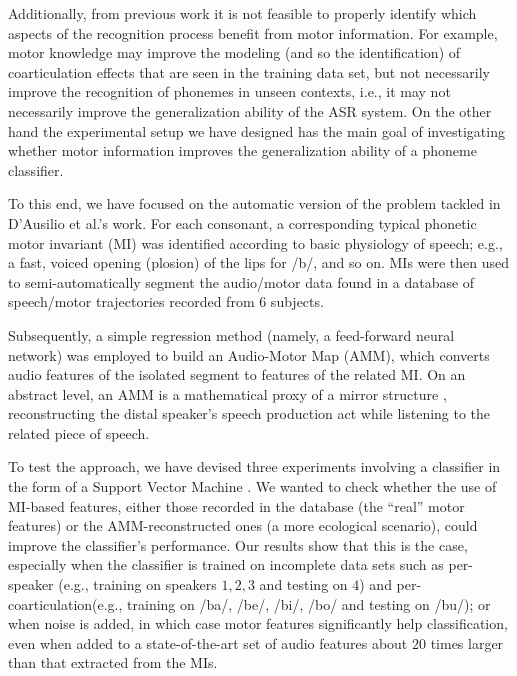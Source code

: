 Additionally, from previous work it is not feasible to properly identify which aspects of the recognition process benefit from motor information. For example, motor knowledge may improve the modeling (and so the identification) of coarticulation effects that are seen in the training data set, but not necessarily improve the recognition of phonemes in unseen contexts, i.e., it may not necessarily improve the generalization ability of the ASR system. On the other hand the experimental setup we have designed has the main goal of investigating whether motor information improves the generalization ability of a phoneme classifier.  


To this end, we have focused on the automatic version of
the problem tackled in D'Ausilio et al.'s work. For each consonant,
a corresponding typical phonetic motor invariant (MI) was
identified according to basic physiology of speech;
e.g., a fast, voiced opening (plosion) of the lips for /b/, and so on.
MIs were then used to semi-automatically segment the audio/motor data found in a
database of speech/motor trajectories recorded from $6$ subjects.

Subsequently, a simple regression method (namely, a feed-forward neural network) was employed
to build an Audio-Motor Map (AMM), which converts audio features of the isolated segment to
features of the related MI. On an abstract level, an AMM is a mathematical proxy of a mirror
structure \cite{umilta-01}, reconstructing the distal speaker's speech production act while
listening to the related piece of speech.

To test the approach, we have devised three experiments involving a 
classifier in the form of a Support Vector Machine \cite{BGV92}. We wanted to check whether
the use of MI-based features, either those recorded in the database (the ``real''
motor features) or the AMM-reconstructed ones (a more ecological scenario),
could improve the classifier's performance. Our results show that this is the case,
especially when the classifier is trained on incomplete data sets such as 
per-speaker (e.g., training on speakers $1,2,3$ and testing on $4$) and
per-coarticulation(e.g., training on /ba/, /be/, /bi/, /bo/ and testing on /bu/); or when noise is added,
in which case motor features significantly help classification, even when added to a
state-of-the-art set of audio features about $20$ times larger than that extracted
from the MIs.

